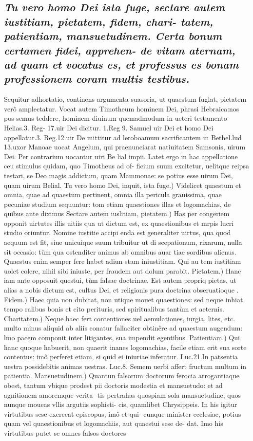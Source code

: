 \documentclass{article}
\begin{document}
\begin{pages}
\subsection*{\textit{Tu vero homo Dei ista fuge, sectare autem iustitiam, pietatem, fidem, chari- tatem, patientiam, mansuetudinem. Certa bonum certamen fidei, apprehen- de vitam aternam, ad quam et vocatus es, et professus es bonam professionem coram multis testibus. }}\pstart Sequitur adhortatio, continens argumenta suasoria, ut quaestum fuglat, pietatem verô amplectatur. Vocat autem Timotheum hominem Dei, phrasi Hebraica:nos pos semus teddere, hominem diuinum quemadmodum in ueteri testamento Helias.3. Reg- 17.uir Dei dicitur. 1.Reg 9. Samuel uir Dei et homo Dei appellatur.3. Reg.12.uir De mittitur ad leroboamum sacrificantem in Bethel.lud 13.uxor Manoae uocat Angelum, qui praenunciarat natiuitatem Samsonis, uirum Dei. Per contrarium uocantur uiri Be lial impii. Latet ergo in hac appellatione ceu stimulus quidam, quo Timotheus ad of- ficium suum excitetur, uelitque reipsa testari, se Deo magis addictum, quam Mammonae: se potius esse uirum Dei, quam uirum Belial.  \pend\pstart Tu vero homo Dei, inquit, ista fuge.) Videlicet quaestum et omnia, quae ad quaestum pertinent, omnia illa pericula grauissima, quae pecuniae studium sequuntur: tom etiam quaestiones illas et logomachias, de quibus ante diximus  \pend\pstart Sectare autem iuslitiam, pietatem.) Has per congeriem opponit uirtutes illis uitiis qua ut dictum est, ex quaestionibus et mrpis lucri studio oriuntur. Nomine iustitie accipi enda est generaliter uirtus, qua quod aequum est fit, siue unicuique suum tribuitur ut di scepationum, rixarum, nulla sit occasio: tùm qua ostenditer animus ab omnibus auar tiae sordibus alienus. Quaestus enim semper fere habet adiun stam iniustitiam. Qui au tem iustitiam uolet colere, nihil sibi iniuste, per fraudem aut dolum parabit.  \pend\pstart Pietatem.) Hanc iam ante opposuit questui, tùm falsae doctrinae. Est autem propriq pietas, ut alias a nobis dictum est, cultus Dei, et religionis pura doctrina obseruatioque . Fidem.) Haec quia non dubitat, non utique mouet quaestiones: sed neque inhiat tempo ralibus bonis et cito perituris, sed spiritualibus tantùm et aeternis.  \pend\pstart Charitatem.) Neque haec fert contentiones uel aemulationes, iurgia, lites, etc. multo minus aliquid ab aliis conatur fallaciter obtinêre ad quaestum augendum: lmo pacem componit inter litigantes, sua impendit egentibus.  \pend\pstart Patientiam.) Qui hanc quoque habuerit, non quaerit inanes logomachias, facile etiam erit sua sorte contentus: imô perferet etiam, si quid ei iniuriae inferatur. Luc.21.In patsentia uestra possidebitis animas uestras. Luc.8. Semem uerbi affert fructum multum in patientia. Mansuetudinem.) Quantun falsorum doctorum ferocia arrogantiaque obest, tantum vbique prodest pii doctoris modestia et mansuetudo: et ad agnitionem amoremque verita- tis pertrahas quospiam sola mansuetudine, quos nunque moueas vllis argutiis sophisti- cis, quamlibet Chrysippeis. In his igitur virtutibus sese exerceat episcopus, imô et qui- cunque minister ecclesiae, potius quam vel quaestionibus et logomachiis, aut quaestui sese de- dat. Imo his virtutibus putet se omnes falsos doctores 
\end{pages}
\end{document}
